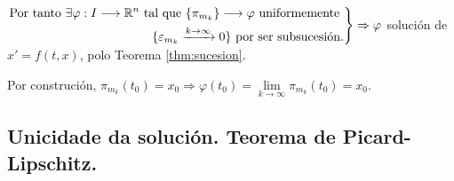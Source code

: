 \documentclass[11pt, a4paper,twoside]{article}
\makeatletter
\theoremstyle{theorem-style}  %
\renewenvironment{proof}[1][\proofname]{\par
	\pushQED{\qed}%
	\normalfont \topsep6\p@\@plus6\p@\relax
	\list{}{%
		\settowidth{\leftmargin}{\quad:\hskip\labelsep}%
		\setlength{\labelwidth}{0pt}%
		\setlength{\itemindent}{-\leftmargin}%
	}%
	\item[\hskip\labelsep\itshape#1\@addpunct{:}]\ignorespaces
}{%
	\popQED\endlist\@endpefalse
}
\theoremstyle{definition-style}
\theoremstyle{example-style}
\newenvironment{rcases}
{\left.\begin{aligned}}
	{\end{aligned}\right\rbrace}
\makeatother
\begin{document}
\begin{proof}
	$ \begin{rcases}
		\text{Por tanto } \exists \varphi: I\longrightarrow \mathbb{R}^n \text{ tal que } \{\pi_{m_k} \}\longrightarrow \varphi \text{ uniformemente }\\
		\{\varepsilon_{m_k}\xrightarrow{k\to \infty}0  \} \text{ por ser subsucesión.}
	\end{rcases} \Rightarrow \varphi$ solución de $ x'=f(t,x) $, polo Teorema \ref{thm:sucesion}.
	
	Por construción, $ \pi_{m_k}(t_0)=x_0 \Rightarrow \varphi(t_0) = \lim\limits_{k\to \infty}\pi_{m_k}(t_0)=x_0$.
\end{proof}

\subsection{Unicidade da solución. Teorema de Picard-Lipschitz.}
\end{document}
